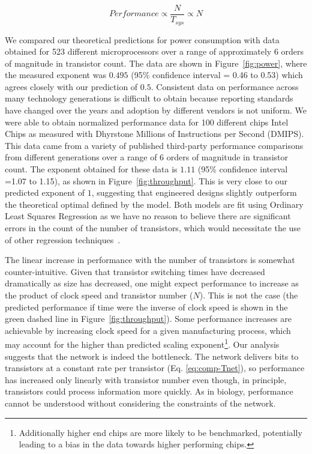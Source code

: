 \documentclass[12pt]{article}
\begin{document}
\begin{equation}
\label{eq:Performance}
Performance\propto \frac{N}{T_{sys}} \propto N
\end{equation}

We compared our theoretical predictions for power consumption with data
obtained for 523 different microprocessors over a range of approximately 6
orders of magnitude in transistor count.  The data are shown in
Figure~\ref{fig:power}, where the measured exponent was $0.495$ (95\%
confidence interval = 0.46 to 0.53) which agrees closely with our prediction of
$0.5$. Consistent data on performance across many technology generations is
difficult to obtain because reporting standards have changed over the years and
adoption by different vendors is not uniform.  We were able to obtain
normalized performance data for 100 different chips Intel Chips as measured
with Dhyrstone Millions of Instructions per Second (DMIPS). This data came from
a variety of published third-party performance comparisons from different
generations over a range of 6 orders of magnitude in transistor count.  The
exponent obtained for these data is $1.11$ (95\% confidence interval =1.07 to
1.15), as shown in Figure~\ref{fig:throughput}. This is very close to our
predicted exponent of $1$, suggesting that engineered designs slightly
outperform the theoretical optimal defined by the model. Both models are fit
using Ordinary Least Squares Regression as we have no reason to believe there
are significant errors in the count of the number of transistors, which would
necessitate the use of other regression
techniques~\cite{mcardle1988structural}.  

The linear increase in performance with the number of transistors is somewhat
counter-intuitive. Given that transistor switching times have decreased
dramatically as size has decreased, one might expect performance to increase as
the product of clock speed and transistor number ($N$). This is not the case
(the predicted performance if time were the inverse of clock speed is shown in
the green dashed line in Figure~\ref{fig:throughput}). Some performance
increases are achievable by increasing clock speed for a given manufacturing
process, which may account for the higher than predicted scaling
exponent\footnote{Additionally higher end chips are more likely to be
benchmarked, potentially leading to a bias in the data towards higher
performing chips.}. Our analysis suggests that the network is indeed the
bottleneck. The network delivers bits to transistors at a constant rate per
transistor (Eq. \ref{eq:comp-Tnet}), so performance has increased only linearly
with transistor number even though, in principle, transistors could process
information more quickly.  As in biology, performance cannot be understood
without considering the constraints of the network.
\end{document}
